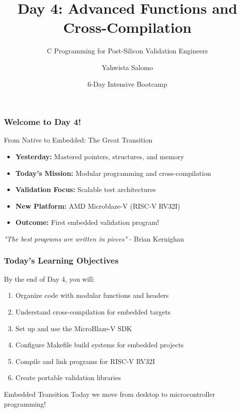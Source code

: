 \documentclass{beamer}
\title{Day 4: Advanced Functions and Cross-Compilation}
\subtitle{C Programming for Post-Silicon Validation Engineers}
\author{Yahwista Salomo}
\date{6-Day Intensive Bootcamp}
\institute{Post-Silicon Validation Training Program}
\begin{document}
\frame{\titlepage}

\begin{frame}
\frametitle{Welcome to Day 4!}
\begin{center}
\Large From Native to Embedded: The Great Transition
\end{center}

\begin{itemize}
    \item \textbf{Yesterday:} Mastered pointers, structures, and memory
    \item \textbf{Today's Mission:} Modular programming and cross-compilation
    \item \textbf{Validation Focus:} Scalable test architectures
    \item \textbf{New Platform:} AMD Microblaze-V (RISC-V RV32I)
    \item \textbf{Outcome:} First embedded validation program!
\end{itemize}

\vspace{0.5cm}
\begin{center}
\textit{"The best programs are written in pieces"} - Brian Kernighan
\end{center}
\end{frame}

\begin{frame}
\frametitle{Today's Learning Objectives}
By the end of Day 4, you will:

\begin{enumerate}
    \item Organize code with modular functions and headers
    \item Understand cross-compilation for embedded targets
    \item Set up and use the MicroBlaze-V SDK
    \item Configure Makefile build systems for embedded projects
    \item Compile and link programs for RISC-V RV32I
    \item Create portable validation libraries
\end{enumerate}

\vspace{0.5cm}
\begin{alertblock}{Embedded Transition}
Today we move from desktop to microcontroller programming!
\end{alertblock}
\end{frame}
\end{document}
